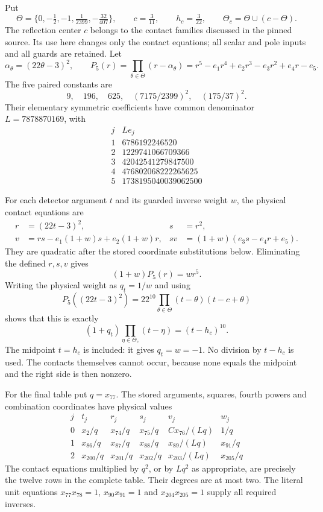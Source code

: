 \documentclass[11pt,a4paper]{article}
\begin{document}
Put
\[
 \Theta=\{0,-\tfrac12,-1,\tfrac1{2399},-\tfrac{32}{407}\},
 \qquad c=\tfrac3{11},\qquad h_c=\tfrac3{22},
 \qquad \Theta_c=\Theta\cup(c-\Theta).
\]
The reflection center $c$ belongs to the contact families discussed
in the pinned source. Its use here changes only the contact
equations; all scalar and pole inputs and all guards are retained.
Let
\[
 \alpha_\theta=(22\theta-3)^2,\qquad
 P_5(r)=\prod_{\theta\in\Theta}(r-\alpha_\theta)
       =r^5-e_1r^4+e_2r^3-e_3r^2+e_4r-e_5.
\]
The five paired constants are
\[
 9,\quad196,\quad625,\quad
 (7175/2399)^2,\quad(175/37)^2.
\]
Their elementary symmetric coefficients have common denominator
$L=7878870169$, with
\[
\begin{array}{c|r}
j&Le_j\\\hline
1&6786192246520\\
2&1229741066709366\\
3&42042541279847500\\
4&476802068222265625\\
5&1738195040039062500
\end{array}
\]

For each detector argument $t$ and its guarded inverse weight $w$,
the physical contact equations are
\begin{align*}
 r&=(22t-3)^2,&s&=r^2,\\
 v&=rs-e_1(1+w)s+e_2(1+w)r,&
 sv&=(1+w)(e_3s-e_4r+e_5).
\end{align*}
They are quadratic after the stored coordinate substitutions below.
Eliminating the defined $r,s,v$ gives
\[
 (1+w)P_5(r)=wr^5.
\]
Writing the physical weight as $q_t=1/w$ and using
\[
 P_5((22t-3)^2)
  =22^{10}\prod_{\theta\in\Theta}(t-\theta)(t-c+\theta)
\]
shows that this is exactly
\[
 (1+q_t)\prod_{\eta\in\Theta_c}(t-\eta)=(t-h_c)^{10}.
\]
The midpoint $t=h_c$ is included: it gives $q_t=w=-1$.
No division by $t-h_c$ is used. The contacts themselves cannot occur,
because none equals the midpoint and the right side is then nonzero.

For the final table put $q=x_{77}$. The stored arguments, squares,
fourth powers and combination coordinates have physical values
\[
\begin{array}{c|cccc|c}
j&t_j&r_j&s_j&v_j&w_j\\\hline
0&x_2/q&x_{74}/q&x_{75}/q&Cx_{76}/(Lq)&1/q\\
1&x_{86}/q&x_{87}/q&x_{88}/q&x_{89}/(Lq)&x_{91}/q\\
2&x_{200}/q&x_{201}/q&x_{202}/q&x_{203}/(Lq)&x_{205}/q
\end{array}
\]
The contact equations multiplied by $q^2$, or by $Lq^2$ as
appropriate, are precisely the twelve rows in the complete table.
Their degrees are at most two. The literal unit equations
$x_{77}x_{78}=1$, $x_{90}x_{91}=1$ and
$x_{204}x_{205}=1$ supply all required inverses.
\end{document}
